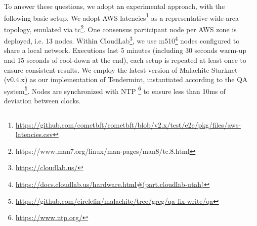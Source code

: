 To answer these questions, we adopt an experimental approach,
with the following basic setup.
    We adopt AWS latencies\footnote{\url{https://github.com/cometbft/cometbft/blob/v2.x/test/e2e/pkg/files/aws-latencies.csv}} as a representative wide-area topology, emulated via tc\footnote{https://www.man7.org/linux/man-pages/man8/tc.8.html}. 
    One consensus participant node per AWS zone is deployed, i.e. 13 nodes. 
    Within CloudLab\footnote{\url{https://cloudlab.us/}}, we use m510\footnote{\url{https://docs.cloudlab.us/hardware.html\#(part.cloudlab-utah)}}  nodes configured to share a local network.
    Executions last 5 minutes (including 30 seconds warm-up and 15 seconds of cool-down at the end), each setup is repeated at least once to ensure consistent results.
    We employ the latest version of Malachite Starknet (v0.4.x) as our implementation of Tendermint, instantiated according to the QA system\footnote{\url{https://github.com/circlefin/malachite/tree/greg/qa-fix-write/qa}}.
    Nodes are synchronized with NTP \footnote{\url{https://www.ntp.org/}} to ensure less than 10ms of deviation between clocks. 

